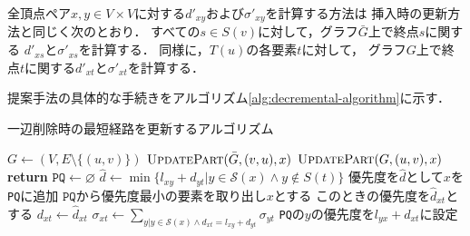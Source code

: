 全頂点ペア$x,y\in V\times V$に対する$d'_{xy}$および$\sigma'_{xy}$を計算する方法は
挿入時の更新方法と同じく次のとおり．
すべての$s\in S(v)$に対して，グラフ$\bar{G}$上で終点$s$に関する
$d'_{xs}$と$\sigma'_{xs}$を計算する．
同様に，$T(u)$の各要素$t$に対して，
グラフ$G$上で終点$t$に関する$d'_{xt}$と$\sigma'_{xt}$を計算する．

提案手法の具体的な手続きをアルゴリズム\ref{alg:decremental-algorithm}に示す．

\begin{algorithm}[tbp]
  \caption{一辺削除時の最短経路を更新するアルゴリズム}
  \label{alg:decremental-algorithm}
  \begin{multicols}{2}
    \begin{algorithmic}[1]\small
      \State $G\gets (V,E\setminus\{(u,v)\})$
      \State $\textproc{UpdatePart}(\bar{G},(v,u),x)$
      \EndFor
      \State $\textproc{UpdatePart}(G,(u,v),x)$
      \EndFor
      \EndProcedure
      \vfill\null
      \columnbreak
      \State \textbf{return}
      \EndIf
      \State $\texttt{PQ}\gets\varnothing$
      \State $\hat{d}\gets\min\{l_{xy}+d_{yt}|y\in\mathcal{S}(x)\land y\notin S(t)\}$
      \State 優先度を$\hat{d}$として$x$を\texttt{PQ}に追加
      \EndIf
      \EndFor
      \State $\texttt{PQ}$から優先度最小の要素を取り出し$x$とする
      \State このときの優先度を$\hat{d}_{xt}$とする
      \State $d_{xt}\gets\hat{d}_{xt}$
      \State $\sigma_{xt}\gets\sum_{y|y\in\mathcal{S}(x)\land d_{xt}=l_{xy}+d_{yt}}\sigma_{yt}$
      \State \texttt{PQ}の$y$の優先度を$l_{yx}+d_{xt}$に設定
      \EndIf
      \EndFor
      \EndWhile
      \EndProcedure
    \end{algorithmic}
  \end{multicols}
\end{algorithm}
